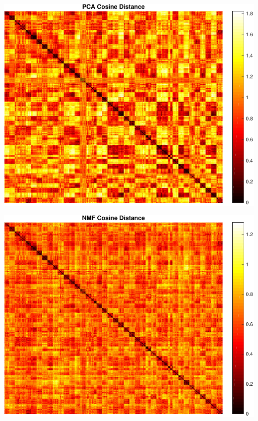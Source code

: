 \begin{center}
\begin{minipage}[t]{\linewidth}
\center
{
\includegraphics[width=\MyFactor\textwidth]{Img/pcacos} 
}
\end{minipage}
\medskip
\end{center}

\begin{center}
\begin{minipage}[t]{\linewidth}
\center
{
\includegraphics[width=\MyFactor\textwidth]{Img/nmfcos} 
}
\end{minipage}
\medskip
\end{center}

